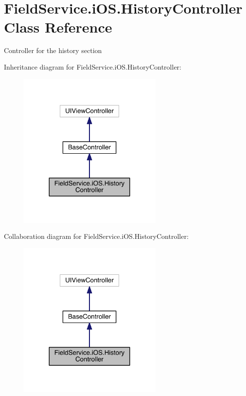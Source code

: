 \hypertarget{class_field_service_1_1i_o_s_1_1_history_controller}{\section{Field\+Service.\+i\+O\+S.\+History\+Controller Class Reference}
\label{class_field_service_1_1i_o_s_1_1_history_controller}
}


Controller for the history section  




Inheritance diagram for Field\+Service.\+i\+O\+S.\+History\+Controller\+:
\nopagebreak
\begin{figure}[H]
\begin{center}
\leavevmode
\includegraphics[width=204pt]{class_field_service_1_1i_o_s_1_1_history_controller__inherit__graph}
\end{center}
\end{figure}


Collaboration diagram for Field\+Service.\+i\+O\+S.\+History\+Controller\+:
\nopagebreak
\begin{figure}[H]
\begin{center}
\leavevmode
\includegraphics[width=204pt]{class_field_service_1_1i_o_s_1_1_history_controller__coll__graph}
\end{center}
\end{figure}

